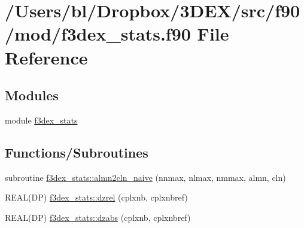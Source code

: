 \hypertarget{f3dex__stats_8f90}{
\section{/Users/bl/Dropbox/3DEX/src/f90/mod/f3dex\_\-stats.f90 File Reference}
\label{f3dex__stats_8f90}
}
\subsection*{Modules}
\begin{DoxyCompactItemize}
\item 
module \hyperlink{namespacef3dex__stats}{f3dex\_\-stats}
\end{DoxyCompactItemize}
\subsection*{Functions/Subroutines}
\begin{DoxyCompactItemize}
\item 
subroutine \hyperlink{namespacef3dex__stats_af82543b20c426be1736a4fed0d1ca80c}{f3dex\_\-stats::almn2cln\_\-naive} (nnmax, nlmax, nmmax, almn, cln)
\item 
REAL(DP) \hyperlink{namespacef3dex__stats_afc9d6ca61536648a01f8b6769080283e}{f3dex\_\-stats::dzrel} (cplxnb, cplxnbref)
\item 
REAL(DP) \hyperlink{namespacef3dex__stats_a70ed2d6cd6c25b9cd95b04e9223e5828}{f3dex\_\-stats::dzabs} (cplxnb, cplxnbref)
\end{DoxyCompactItemize}
